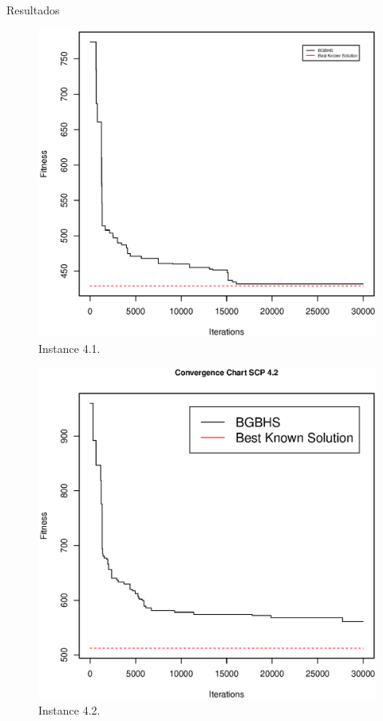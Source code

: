 Resultados


\begin{figure}[]
\centering
\includegraphics[scale=.45]{Resultados/scp41.eps}
\caption{Instance 4.1.}
\label{fig:Instance.4.1}
\end{figure}


\begin{figure}[]
\centering
\includegraphics[scale=.45]{Resultados/scp42.eps}
\caption{Instance 4.2.}
\label{fig:Instance.4.2}
\end{figure}

